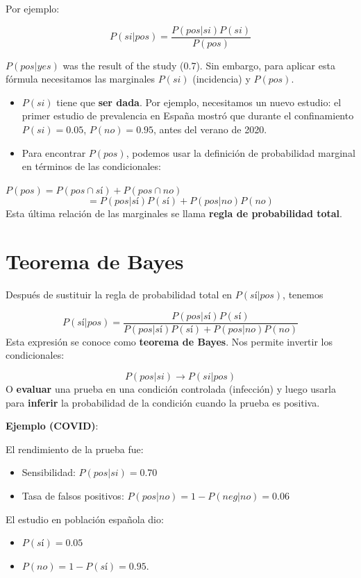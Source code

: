 \documentclass[
]{book}
\providecommand{\tightlist}{%
  \setlength{\itemsep}{0pt}\setlength{\parskip}{0pt}}
\begin{document}
Por ejemplo:

\[P(si|pos)=\frac{P(pos|si)P(si)}{P(pos)}\]

\(P(pos|yes)\) was the result of the study (0.7). Sin embargo, para aplicar esta fórmula necesitamos las marginales \(P(si)\) (incidencia) y \(P(pos)\).

\begin{itemize}
\item
  \(P(si)\) tiene que \textbf{ser dada}. Por ejemplo, necesitamos un nuevo estudio: el primer estudio de prevalencia en España mostró que durante el confinamiento \(P(si)=0.05\), \(P(no)=0.95\), antes del verano de 2020.
\item
  Para encontrar \(P(pos)\), podemos usar la definición de probabilidad marginal en términos de las condicionales:
\end{itemize}

\(P(pos)=P(pos \cap sí) + P(pos \cap no)\)
\[= P(pos|sí)P(sí)+P(pos|no)P(no)\]
Esta última relación de las marginales se llama \textbf{regla de probabilidad total}.

\hypertarget{teorema-de-bayes}{%
\section{Teorema de Bayes}\label{teorema-de-bayes}}

Después de sustituir la regla de probabilidad total en \(P(sí|pos)\), tenemos

\[P(sí|pos)=\frac{P(pos|sí)P(sí)}{P(pos|sí)P(sí)+P(pos|no)P(no)}\]
Esta expresión se conoce como \textbf{teorema de Bayes}. Nos permite invertir los condicionales:

\[P(pos|si) \rightarrow P(si|pos)\]
O \textbf{evaluar} una prueba en una condición controlada (infección) y luego usarla para \textbf{inferir} la probabilidad de la condición cuando la prueba es positiva.

\textbf{Ejemplo (COVID)}:

El rendimiento de la prueba fue:

\begin{itemize}
\item
  Sensibilidad: \(P(pos|si)=0.70\)
\item
  Tasa de falsos positivos: \(P(pos|no)=1- P(neg|no)=0.06\)
\end{itemize}

El estudio en población española dio:

\begin{itemize}
\tightlist
\item
  \(P(sí)=0.05\)
\item
  \(P(no)=1-P(sí)=0.95\).
\end{itemize}
\end{document}
